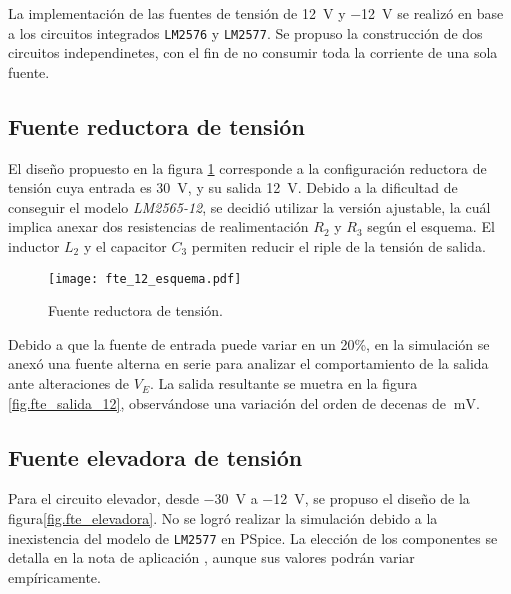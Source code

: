 La implementación de las fuentes de tensión de \SI{12}{\volt} y \SI{-12}{\volt} se realizó en base a los circuitos integrados \texttt{LM2576} y \texttt{LM2577}. Se propuso la construcción de dos circuitos independinetes, con el fin de no consumir toda la corriente de una sola fuente.

\subsection{Fuente reductora de tensión}
El diseño propuesto en la figura \ref{fig.fte_12} corresponde a la configuración reductora de tensión cuya entrada es \SI{+30}{\volt}, y su salida \SI{+12}{\volt}. Debido a la dificultad de conseguir el modelo \textit{LM2565-12}, se decidió utilizar la versión ajustable, la cuál implica anexar dos resistencias de realimentación $R_2$ y $R_3$ según el esquema. El inductor $L_2$ y el capacitor $C_3$ permiten reducir el riple de la tensión de salida.




\begin{figure}
	\centering
	\texttt{[image: fte\_12\_esquema.pdf]}
	\caption{Fuente reductora de tensión.}
	\label{fig.fte_12}
\end{figure}


Debido a que la fuente de entrada puede variar en un 20\%, en la simulación se anexó una fuente alterna en serie para analizar el comportamiento de la salida ante alteraciones de $V_E$. La salida resultante se muetra en la figura \ref{fig.fte_salida_12}, observándose una variación del orden de decenas de $\SI{}{\milli\volt}$.





\subsection{Fuente elevadora de tensión}

Para el circuito elevador, desde \SI{-30}{\volt} a \SI{-12}{\volt}, se propuso el diseño de la figura\ref{fig.fte_elevadora}. 
No se logró realizar la simulación debido a la inexistencia del modelo de   \texttt{LM2577} en PSpice. 
La elección de los componentes se detalla en la nota de aplicación , aunque sus valores podrán variar empíricamente.


